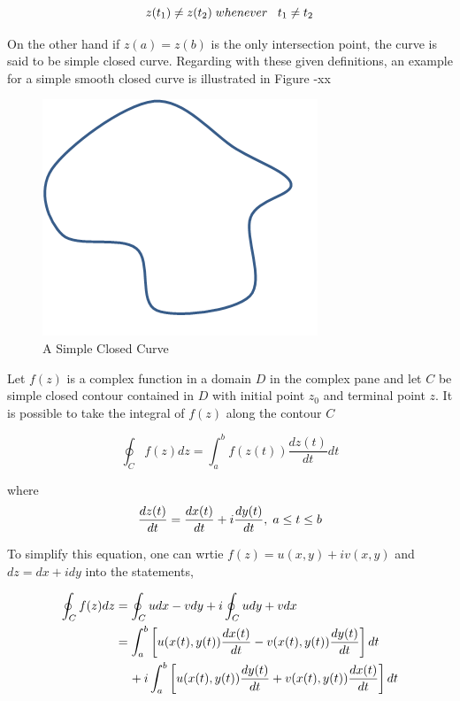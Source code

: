 \begin{equation}
z(t_1) \neq z(t_2)   \hspace{0.1cm} whenever   \hspace{0.3cm} t_1\neq t_2
\end{equation}
		
On the other hand if  $z(a)=z(b)$ is the only intersection point, the curve is said to be simple closed curve. Regarding with these given definitions, an example for a  simple smooth closed curve is illustrated in Figure -xx

\begin{figure}[H]
\caption{A Simple Closed Curve}
\centering
\includegraphics[scale = 0.60]{simple_closed_curve}
\end{figure}
		
Let $f(z)$ is a complex function in a domain $D$ in the complex pane and let $C$ be simple closed contour contained in $D$ with initial point $z_0$ and terminal point  $z$. It is possible to take the integral of $f(z)$ along the contour $C$
		
\begin{equation}
\oint_C f(z) dz = \int_{a}^{b} f(z(t))\frac{dz(t)}{dt} dt
\end{equation}
		
where
\begin{equation}
\frac{dz(t)}{dt} = \frac{dx(t)}{dt} + i\frac{dy(t)}{dt},   \hspace{0.1cm} a\leq t\leq b
\end{equation}
		
To simplify this equation, one can wrtie $f(z) = u(x,y) + iv(x,y)$ and $dz = dx + idy$ into the statements,
		
\begin{align*}
\oint_C f(z)dz & = \oint_C u dx - v dy + i \oint_C u dy + v dx \\
&= \int_{a}^{b}\left[u(x(t),y(t) )\frac{dx(t)}{dt} - v(x(t),y(t) )\frac{dy(t)}{dt}\right]dt\\
& \hspace{0.4cm} + i\int_{a}^{b} \left[u(x(t),y(t) )\frac{dy(t)}{dt} + v(x(t),y(t) )\frac{dx(t)}{dt}\right]dt
\end{align*}
		
